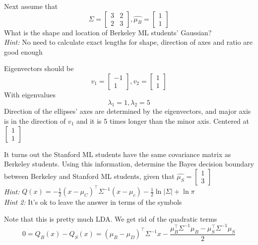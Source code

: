 \begin{Parts}
\Part
Next assume that \[\Sigma = \begin{bmatrix}
3 & 2\\
2 & 3
\end{bmatrix}, \hat{\mu_B} = \begin{bmatrix}
1\\
1
\end{bmatrix}\]
What is the shape and location of Berkeley ML students' Gaussian?\\
\textit{Hint:} No need to calculate exact lengths for shape, direction of axes and ratio are good enough

\begin{solution}
Eigenvectors should be \[v_1 = \begin{bmatrix}
-1\\
1
\end{bmatrix}, v_2 = \begin{bmatrix}
1\\
1
\end{bmatrix}\]
With eigenvalues \[\lambda_1 = 1, \lambda_2 = 5\] Direction of the ellipses' axes are determined by the eigenvectors, and major axis is in the direction of $v_1$ and it is 5 times longer than the minor axis. Centered at $\begin{bmatrix} 1\\ 1\end{bmatrix}$
\end{solution}

\Part
It turns out the Stanford ML students have the same covariance matrix as Berkeley students. Using this information, determine the Bayes decision boundary between Berkeley and Stanford ML students, given that $\hat{\mu_S} = \begin{bmatrix} 1\\ 3 \end{bmatrix}$\\
    \textit{Hint:} $Q(x) = -\frac{1}{2}(x - \mu_C)^{\top}\Sigma^{-1}(x - \mu_c) - \frac{1}{2}\ln |\Sigma| + \ln \pi$\\
    \textit{Hint 2:} It's ok to leave the answer in terms of the symbols

\begin{solution}
    Note that this is pretty much LDA. We get rid of the quadratic terms
    \[
    0 = Q_B(x) - Q_S(x) = (\mu_B - \mu_D)^{\top}\Sigma^{-1}x - \frac{\mu_B^{\top}\Sigma^{-1}\mu_B - \mu_S^{\top}\Sigma^{-1}\mu_S}{2}
    \]
\end{solution}


\end{Parts}

